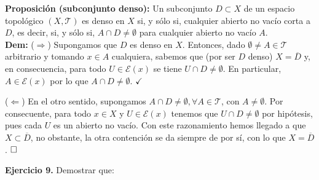 \documentclass{article}
\begin{document}
\vspace{1cm}

\noindent\textbf{Proposición (subconjunto denso):} Un subconjunto $D \subset X$ de un espacio topológico $(X, \mathcal{T})$ es denso en $X$ si, y sólo si, cualquier abierto no vacío corta a $D$, es decir, si, y sólo si, $A \cap D \neq \emptyset$ para cualquier abierto no vacío $A$. \\

\noindent\textbf{Dem:} ($\Longrightarrow$) Supongamos que $D$ es denso en $X$. Entonces, dado $\emptyset \neq A \in \mathcal{T}$ arbitrario y tomando $x \in A$ cualquiera, sabemos que (por ser $D$ denso) $X = \overline{D}$ y, en consecuencia, para todo $U \in \mathcal{E}(x)$ se tiene $U \cap D \neq \emptyset$. En particular, $A \in \mathcal{E}(x)$ por lo que $A \cap D \neq \emptyset$. $\checkmark$ 

\vspace{0.15cm}

\noindent ($\Longleftarrow$) En el otro sentido, supongamos $A \cap D \neq \emptyset, \forall A \in \mathcal{T}$, con $A \neq \emptyset$. Por consecuente, para todo $x \in X$ y $U \in \mathcal{E}(x)$ tenemos que $U \cap D \neq \emptyset$ por hipótesis, pues cada $U$ es un abierto no vacío. Con este razonamiento hemos llegado a que $X \subset \overline{D}$, no obstante, la otra contención se da siempre de por sí, con lo que $X = \overline{D}$. $\hfill\square$

\newpage

\noindent\textbf{Ejercicio 9.} Demostrar que:
\end{document}
